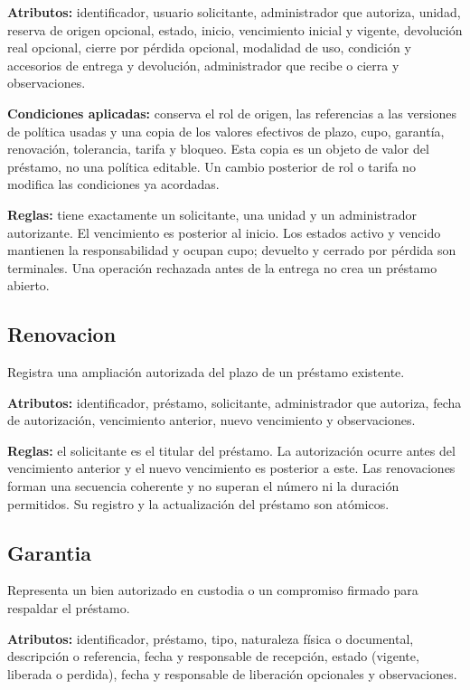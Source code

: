 \textbf{Atributos:} identificador, usuario solicitante, administrador que autoriza, unidad, reserva de origen opcional, estado, inicio, vencimiento inicial y vigente, devoluci\'on real opcional, cierre por p\'erdida opcional, modalidad de uso, condici\'on y accesorios de entrega y devoluci\'on, administrador que recibe o cierra y observaciones.

\textbf{Condiciones aplicadas:} conserva el rol de origen, las referencias a las versiones de pol\'itica usadas y una copia de los valores efectivos de plazo, cupo, garant\'ia, renovaci\'on, tolerancia, tarifa y bloqueo. Esta copia es un objeto de valor del pr\'estamo, no una pol\'itica editable. Un cambio posterior de rol o tarifa no modifica las condiciones ya acordadas.

\textbf{Reglas:} tiene exactamente un solicitante, una unidad y un administrador autorizante. El vencimiento es posterior al inicio. Los estados activo y vencido mantienen la responsabilidad y ocupan cupo; devuelto y cerrado por p\'erdida son terminales. Una operaci\'on rechazada antes de la entrega no crea un pr\'estamo abierto.

\subsection{Renovacion}
Registra una ampliaci\'on autorizada del plazo de un pr\'estamo existente.

\textbf{Atributos:} identificador, pr\'estamo, solicitante, administrador que autoriza, fecha de autorizaci\'on, vencimiento anterior, nuevo vencimiento y observaciones.

\textbf{Reglas:} el solicitante es el titular del pr\'estamo. La autorizaci\'on ocurre antes del vencimiento anterior y el nuevo vencimiento es posterior a este. Las renovaciones forman una secuencia coherente y no superan el n\'umero ni la duraci\'on permitidos. Su registro y la actualizaci\'on del pr\'estamo son at\'omicos.

\subsection{Garantia}
Representa un bien autorizado en custodia o un compromiso firmado para respaldar el pr\'estamo.

\textbf{Atributos:} identificador, pr\'estamo, tipo, naturaleza f\'isica o documental, descripci\'on o referencia, fecha y responsable de recepci\'on, estado (vigente, liberada o perdida), fecha y responsable de liberaci\'on opcionales y observaciones.

